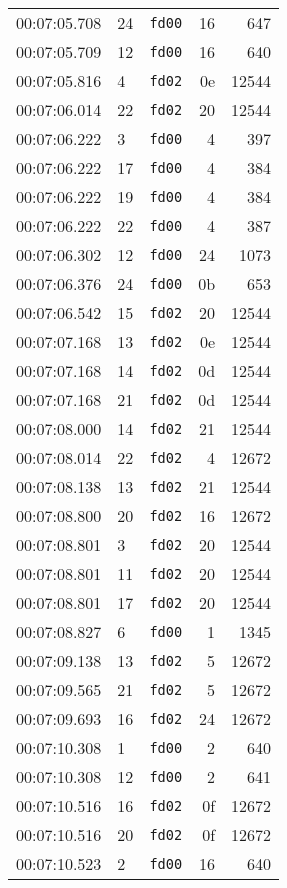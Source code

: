\documentclass{article}
\begin{document}
\begin{longtable}{lllrr}
00:07:05.708 & 24 & \texttt{fd00} & 16 & 647 \\
00:07:05.709 & 12 & \texttt{fd00} & 16 & 640 \\
00:07:05.816 & 4 & \texttt{fd02} & 0e & 12544 \\
00:07:06.014 & 22 & \texttt{fd02} & 20 & 12544 \\
00:07:06.222 & 3 & \texttt{fd00} & 4 & 397 \\
00:07:06.222 & 17 & \texttt{fd00} & 4 & 384 \\
00:07:06.222 & 19 & \texttt{fd00} & 4 & 384 \\
00:07:06.222 & 22 & \texttt{fd00} & 4 & 387 \\
00:07:06.302 & 12 & \texttt{fd00} & 24 & 1073 \\
00:07:06.376 & 24 & \texttt{fd00} & 0b & 653 \\
00:07:06.542 & 15 & \texttt{fd02} & 20 & 12544 \\
00:07:07.168 & 13 & \texttt{fd02} & 0e & 12544 \\
00:07:07.168 & 14 & \texttt{fd02} & 0d & 12544 \\
00:07:07.168 & 21 & \texttt{fd02} & 0d & 12544 \\
00:07:08.000 & 14 & \texttt{fd02} & 21 & 12544 \\
00:07:08.014 & 22 & \texttt{fd02} & 4 & 12672 \\
00:07:08.138 & 13 & \texttt{fd02} & 21 & 12544 \\
00:07:08.800 & 20 & \texttt{fd02} & 16 & 12672 \\
00:07:08.801 & 3 & \texttt{fd02} & 20 & 12544 \\
00:07:08.801 & 11 & \texttt{fd02} & 20 & 12544 \\
00:07:08.801 & 17 & \texttt{fd02} & 20 & 12544 \\
00:07:08.827 & 6 & \texttt{fd00} & 1 & 1345 \\
00:07:09.138 & 13 & \texttt{fd02} & 5 & 12672 \\
00:07:09.565 & 21 & \texttt{fd02} & 5 & 12672 \\
00:07:09.693 & 16 & \texttt{fd02} & 24 & 12672 \\
00:07:10.308 & 1 & \texttt{fd00} & 2 & 640 \\
00:07:10.308 & 12 & \texttt{fd00} & 2 & 641 \\
00:07:10.516 & 16 & \texttt{fd02} & 0f & 12672 \\
00:07:10.516 & 20 & \texttt{fd02} & 0f & 12672 \\
00:07:10.523 & 2 & \texttt{fd00} & 16 & 640 \\

\end{longtable}
\end{document}

